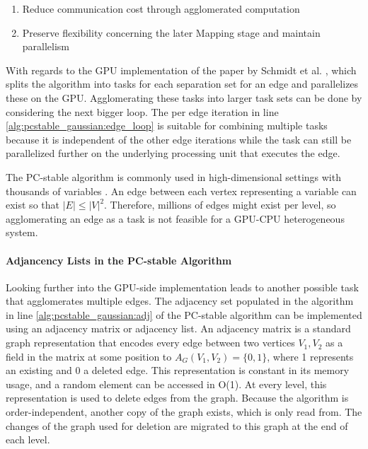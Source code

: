 \begin{enumerate}
    \item Reduce communication cost through agglomerated computation
    \item Preserve flexibility concerning the later Mapping stage and maintain parallelism
\end{enumerate}

With regards to the GPU implementation of the paper by Schmidt et al. \cite{schmidtOrderIndependentConstraintBasedCausal2018}, which splits the algorithm into tasks for each separation set for an edge and parallelizes these on the GPU. Agglomerating these tasks into larger task sets can be done by considering the next bigger loop. The per edge iteration in line \ref{alg:pcstable_gaussian:edge_loop} is suitable for combining multiple tasks because it is independent of the other edge iterations while the task can still be parallelized further on the underlying processing unit that executes the edge.

The PC-stable algorithm is commonly used in high-dimensional settings with thousands of variables \cite{nagarajanFunctionalRelationshipsGenes2010}. An edge between each vertex representing a variable can exist so that $|E| \leq |V|^{2}$. Therefore, millions of edges might exist per level, so agglomerating an edge as a task is not feasible for a GPU-CPU heterogeneous system.

\paragraph{Adjancency Lists in the PC-stable Algorithm}
Looking further into the GPU-side implementation leads to another possible task that agglomerates multiple edges. The adjacency set populated in the algorithm in line \ref{alg:pcstable_gaussian:adj} of the PC-stable algorithm can be implemented using an adjacency matrix or adjacency list. An adjacency matrix is a standard graph representation that encodes every edge between two vertices $V_1, V_2$ as a field in the matrix at some position to $A_G(V_1, V_2) = \{0,1\}$, where 1 represents an existing and 0 a deleted edge. This representation is constant in its memory usage, and a random element can be accessed in O(1). At every level, this representation is used to delete edges from the graph. Because the algorithm is order-independent, another copy of the graph exists, which is only read from. The changes of the graph used for deletion are migrated to this graph at the end of each level.

